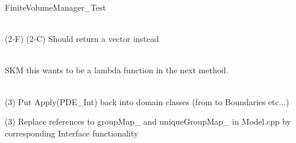 \begin{DoxyRefList}
Finite\+Volume\+Manager\+\_\+\+Test 
\item[Member \doxylink{group___c_s_m_pglobal_functions_gac39e1cc2826fce87c457e092c660ae03}{csmp\+::minimum\+Distance\+Between} (const Domain$<$ dim $>$ \&d1, const Domain$<$ dim $>$ \&d2)]\hfill \\
\label{todo__todo000009}%
%
(2-\/F) (2-\/C) Should return a vector instead  
\item[Member \doxylink{namespacecsmp_afaad11a76a23c4669deec35930d4be87}{csmp\+::min\+Max\+Eigen\+Values} (const \doxylink{classcsmp_1_1_tensor_variable}{Tensor\+Variable$<$ dim $>$} \&ts, double \&tmin, double \&tmax)]\hfill \\
\label{todo__todo000170}%
%
SKM this wants to be a lambda function in the next method.  
\item[Class \doxylink{classcsmp_1_1_model}{csmp\+::Model\texorpdfstring{$<$}{<} dim \texorpdfstring{$>$}{>}} ]\hfill \\
\label{todo__todo000001}%
%
(3) Put Apply(\+PDE\+\_\+\+Int) back into domain classes (from  to Boundaries etc...) 



(3) Replace references to group\+Map\+\_\+ and unique\+Group\+Map\+\_\+ in Model.\+cpp by corresponding Interface functionality 




\end{DoxyRefList}
